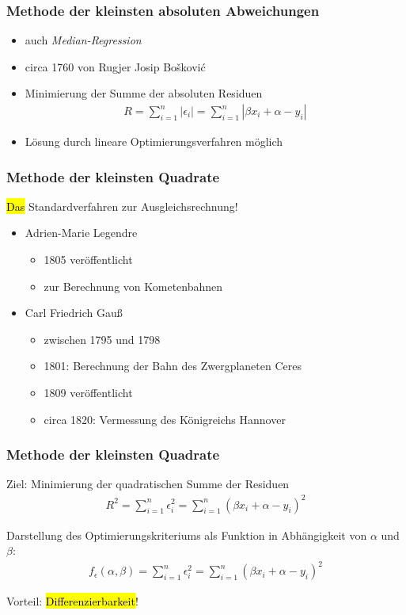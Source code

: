 \begin{frame}
\frametitle{Methode der kleinsten absoluten Abweichungen}

\begin{itemize}
	\item auch \textit{Median-Regression}
	\item circa 1760 von Rugjer Josip Bošković
	\item Minimierung der Summe der absoluten Residuen \begin{align*}
		R = \sum_{i=1}^{n} \left| \epsilon_i \right| = \sum_{i=1}^{n} \left| \beta x_i + \alpha - y_i \right|
	\end{align*}
	\item Lösung durch lineare Optimierungsverfahren möglich
\end{itemize}

\end{frame}


\begin{frame}
\frametitle{Methode der kleinsten Quadrate}

\hl{Das} Standardverfahren zur Ausgleichsrechnung!

\begin{itemize}
	\item Adrien-Marie Legendre \begin{itemize}
		\item 1805 veröffentlicht
		\item zur Berechnung von Kometenbahnen
	\end{itemize}
	\item Carl Friedrich Gauß \begin{itemize}
		\item zwischen 1795 und 1798
		\item 1801: Berechnung der Bahn des Zwergplaneten Ceres
		\item 1809 veröffentlicht
		\item circa 1820: Vermessung des Königreichs Hannover
	\end{itemize}
\end{itemize}

\end{frame}


\begin{frame}
\frametitle{Methode der kleinsten Quadrate}

Ziel: Minimierung der quadratischen Summe der Residuen
\begin{align*}
	R^2 = \sum_{i=1}^{n} \epsilon_i^2 = \sum_{i=1}^{n} (\beta x_i + \alpha - y_i)^2
\end{align*}

Darstellung des Optimierungskriteriums als Funktion in Abhängigkeit von $\alpha$ und $\beta$:
\begin{align*}
	f_{\epsilon}(\alpha, \beta) = \sum_{i=1}^{n} \epsilon_i^2 = \sum_{i=1}^{n} (\beta x_i + \alpha - y_i)^2
\end{align*}

Vorteil: \hl{Differenzierbarkeit}!

\end{frame}

